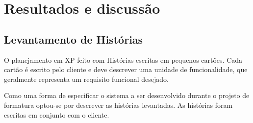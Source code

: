 
\chapter{Resultados e discussão}

\section{Levantamento de Histórias}

  O planejamento em XP feito com Histórias escritas em pequenos cartões. Cada cartão é escrito pelo cliente e deve descrever uma unidade de funcionalidade, que geralmente representa um requisito funcional desejado\cite{sato07}.

  Como uma forma de especificar o sistema a ser desenvolvido durante o projeto de formatura optou-se por descrever as histórias levantadas. As histórias foram escritas em conjunto com o cliente.

